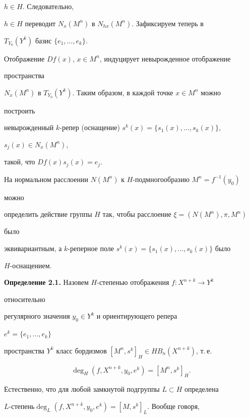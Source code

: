 $h\in H$. Следовательно, 


$h\in H$ переводит $N_x(M^n)$ в $N_{hx}(M^n)$. Зафиксируем теперь в 


$T_{Y_0}(Y^k)$ базис $\{e_1,\dotsc,e_k\}$. 


Отображение $Df(x)$, $x\in M^n$, индуцирует невырожденное отображение 


пространства 


$N_x(M^n)$ в $T_{Y_0}(Y^k)$. Таким образом, в каждой точке $x\in M^n$ можно 


построить 


невырожденный $k$-репер (оснащение) $s^k(x)=\{s_1(x),\dotsc,s_k(x)\}$, 


$s_j(x)\in N_x(M^n)$, 


такой, что $Df(x)s_j(x)=e_j$. 


 


На нормальном расслоении $N(M^n)$ к $H$-подмногообразию $M^n=f^{-1}(y_0)$ 


можно 


определить действие группы $H$ так, чтобы расслоение $\xi=(N(M^n),\pi,M^n)$ 


было 


эквивариантным, а $k$-реперное поле $s^k(x)=\{s_1(x),\dotsc,s_k(x)\}$ было 


$H$-оснащением. 


\medskip 


 


{\bf Определение 2.1.} Назовем $H$-степенью отображения $f:X^{n+k}\to Y^k$ 


относительно 


регулярного значения $y_0\in Y^k$ и ориентирующего репера 


$e^k=\{e_1,\dotsc,e_k\}$ 


пространства $Y^k$ класс бордизмов $[M^n,s^k]_H\in HB_n(X^{n+k})$, т.\,е. 


$$ 


\deg_H(f,X^{n+k},y_0,e^k)=[M^n,s^k]_H. 


$$ 


\medskip 


 


Естественно, что для любой замкнутой подгруппы $L\subset H$ определена 


$L$-степень\linebreak $\deg_L(f,X^{n+k},y_0,e^k)=[M,s^k]_L$. Вообще говоря,


